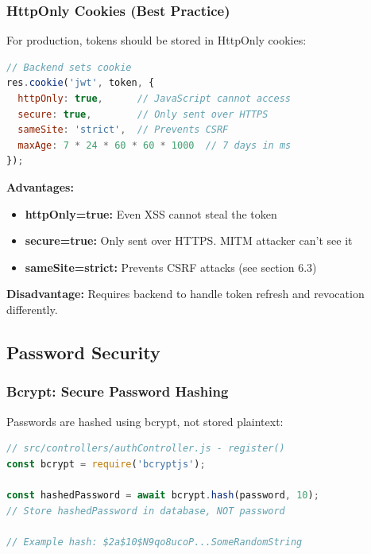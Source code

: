 \documentclass[12pt,a4paper,oneside]{article}
\begin{document}
\subsubsection{HttpOnly Cookies (Best Practice)}

For production, tokens should be stored in HttpOnly cookies:

\begin{lstlisting}[language=JavaScript, caption=HttpOnly Cookie Storage (Recommended)]
// Backend sets cookie
res.cookie('jwt', token, {
  httpOnly: true,      // JavaScript cannot access
  secure: true,        // Only sent over HTTPS
  sameSite: 'strict',  // Prevents CSRF
  maxAge: 7 * 24 * 60 * 60 * 1000  // 7 days in ms
});
\end{lstlisting}

\textbf{Advantages:}

\begin{itemize}
    \item \textbf{httpOnly=true:} Even XSS cannot steal the token
    \item \textbf{secure=true:} Only sent over HTTPS. MITM attacker can't see it
    \item \textbf{sameSite=strict:} Prevents CSRF attacks (see section 6.3)
\end{itemize}

\textbf{Disadvantage:} Requires backend to handle token refresh and revocation differently.

\subsection{Password Security}

\subsubsection{Bcrypt: Secure Password Hashing}

Passwords are hashed using bcrypt, not stored plaintext:

\begin{lstlisting}[language=JavaScript, caption=Password Hashing During Registration]
// src/controllers/authController.js - register()
const bcrypt = require('bcryptjs');

const hashedPassword = await bcrypt.hash(password, 10);
// Store hashedPassword in database, NOT password

// Example hash: $2a$10$N9qo8ucoP...SomeRandomString
\end{lstlisting}
\end{document}
